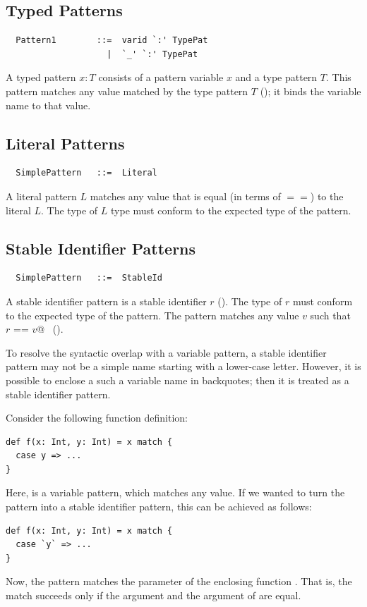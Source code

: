 \subsection{Typed Patterns}

\syntax
\begin{lstlisting}
  Pattern1        ::=  varid `:' TypePat
                    |  `_' `:' TypePat
\end{lstlisting}

A typed pattern $x: T$ consists of a pattern variable $x$ and a
type pattern $T$.  This pattern matches any value matched by the type
pattern $T$ (); it binds the variable name to
that value.

\subsection{Literal Patterns}

\syntax\begin{lstlisting}
  SimplePattern   ::=  Literal
\end{lstlisting}

A literal pattern $L$ matches any value that is equal (in terms of
$==$) to the literal $L$. The type of $L$ type must conform to the
expected type of the pattern.

\subsection{Stable Identifier Patterns} 

\syntax
\begin{lstlisting}
  SimplePattern   ::=  StableId
\end{lstlisting}

A stable identifier pattern is a stable identifier $r$
(). The type of $r$ must conform to the expected
type of the pattern. The pattern matches any value $v$ such that
~\lstinline@$r$ == $v$@~ ().

To resolve the syntactic overlap with a variable pattern, a
stable identifier pattern may not be a simple name starting with a lower-case
letter. However, it is possible to enclose a such a variable name in
backquotes; then it is treated as a stable identifier pattern.

\example Consider the following function definition:
\begin{lstlisting}
def f(x: Int, y: Int) = x match {
  case y => ...
}
\end{lstlisting}
Here, \lstinline@y@ is a variable pattern, which matches any value.
If we wanted to turn the pattern into a stable identifier pattern, this
can be achieved as follows:
\begin{lstlisting}
def f(x: Int, y: Int) = x match {
  case `y` => ...
}
\end{lstlisting}
Now, the pattern matches the  parameter of the enclosing function .
That is, the match succeeds only if the  argument and the 
argument of  are equal.

